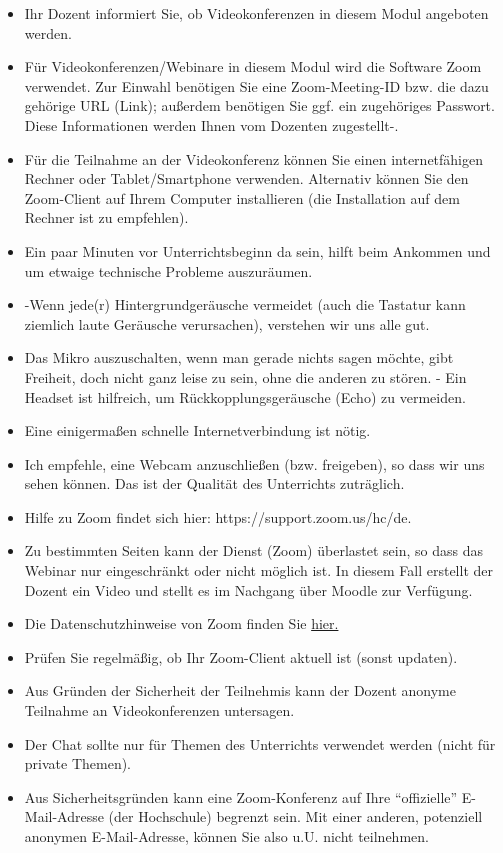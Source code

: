 \documentclass[
  a4paper,
  DIV=11]{scrreprt}
\providecommand{\tightlist}{%
  \setlength{\itemsep}{0pt}\setlength{\parskip}{0pt}}\usepackage{longtable,booktabs,array}
\theoremstyle{definition}
\theoremstyle{definition}
\theoremstyle{remark}
\begin{document}
\begin{itemize}
\tightlist
\item
  Ihr Dozent informiert Sie, ob Videokonferenzen in diesem Modul
  angeboten werden.
\item
  Für Videokonferenzen/Webinare in diesem Modul wird die Software Zoom
  verwendet. Zur Einwahl benötigen Sie eine Zoom-Meeting-ID bzw. die
  dazu gehörige URL (Link); außerdem benötigen Sie ggf. ein zugehöriges
  Passwort. Diese Informationen werden Ihnen vom Dozenten zugestellt-.
\item
  Für die Teilnahme an der Videokonferenz können Sie einen
  internetfähigen Rechner oder Tablet/Smartphone verwenden. Alternativ
  können Sie den Zoom-Client auf Ihrem Computer installieren (die
  Installation auf dem Rechner ist zu empfehlen).
\item
  Ein paar Minuten vor Unterrichtsbeginn da sein, hilft beim Ankommen
  und um etwaige technische Probleme auszuräumen.
\item
  -Wenn jede(r) Hintergrundgeräusche vermeidet (auch die Tastatur kann
  ziemlich laute Geräusche verursachen), verstehen wir uns alle gut.
\item
  Das Mikro auszuschalten, wenn man gerade nichts sagen möchte, gibt
  Freiheit, doch nicht ganz leise zu sein, ohne die anderen zu stören. -
  Ein Headset ist hilfreich, um Rückkopplungsgeräusche (Echo) zu
  vermeiden.
\item
  Eine einigermaßen schnelle Internetverbindung ist nötig.
\item
  Ich empfehle, eine Webcam anzuschließen (bzw. freigeben), so dass wir
  uns sehen können. Das ist der Qualität des Unterrichts zuträglich.
\item
  Hilfe zu Zoom findet sich hier: https://support.zoom.us/hc/de.
\item
  Zu bestimmten Seiten kann der Dienst (Zoom) überlastet sein, so dass
  das Webinar nur eingeschränkt oder nicht möglich ist. In diesem Fall
  erstellt der Dozent ein Video und stellt es im Nachgang über Moodle
  zur Verfügung.
\item
  Die Datenschutzhinweise von Zoom finden Sie
  \href{https://zoom.us/docs/en-us/privacy-and-security.html}{hier.}
\item
  Prüfen Sie regelmäßig, ob Ihr Zoom-Client aktuell ist (sonst updaten).
\item
  Aus Gründen der Sicherheit der Teilnehmis kann der Dozent anonyme
  Teilnahme an Videokonferenzen untersagen.
\item
  Der Chat sollte nur für Themen des Unterrichts verwendet werden (nicht
  für private Themen).
\item
  Aus Sicherheitsgründen kann eine Zoom-Konferenz auf Ihre
  ``offizielle'' E-Mail-Adresse (der Hochschule) begrenzt sein. Mit
  einer anderen, potenziell anonymen E-Mail-Adresse, können Sie also
  u.U. nicht teilnehmen.
\end{itemize}
\end{document}

